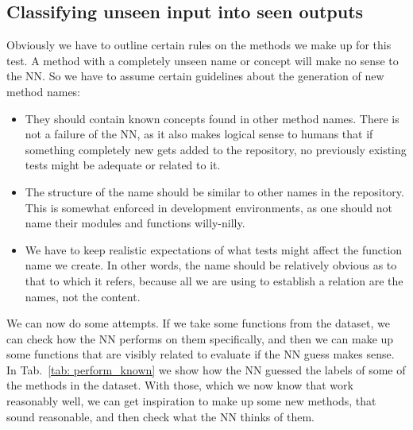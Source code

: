 \documentclass[a4paper, 11pt]{report}
\begin{document}
    \subsection{Classifying unseen input into seen outputs}
    Obviously we have to outline certain rules on the methods we make up for this test. A method with a completely unseen name or concept will make no sense to the NN. So we have to assume certain guidelines about the generation of new method names:

    \begin{itemize}
        \item They should contain known concepts found in other method names. There is not a failure of the NN, as it also makes logical sense to humans that if something completely new gets added to the repository, no previously existing tests might be adequate or related to it.
        \item The structure of the name should be similar to other names in the repository. This is somewhat enforced in development environments, as one should not name their modules and functions willy-nilly.
        \item We have to keep realistic expectations of what tests might affect the function name we create. In other words, the name should be relatively obvious as to that to which it refers, because all we are using to establish a relation are the names, not the content.
    \end{itemize}

    We can now do some attempts. If we take some functions from the dataset, we can check how the NN performs on them specifically, and then we can make up some functions that are visibly related to evaluate if the NN guess makes sense. In Tab.~\ref{tab: perform_known} we show how the NN guessed the labels of some of the methods in the dataset. With those, which we now know that work reasonably well, we can get inspiration to make up some new methods, that sound reasonable, and then check what the NN thinks of them.
\end{document}

